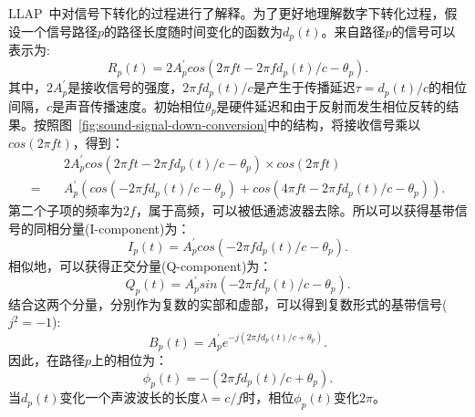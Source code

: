 LLAP~\cite{wang2016device}中对信号下转化的过程进行了解释。为了更好地理解数字下转化过程，假设一个信号路径$p$的路径长度随时间变化的函数为$d_p\left( t\right)$。来自路径$p$的信号可以表示为:
\begin{equation}
  R_{p}\left( t\right) = 2A^{'}_{p}cos \left( 2\pi ft - 2\pi fd_{p}\left( t \right) / c - \theta_{p} \right).
\end{equation}
其中，$2A^{'}_{p}$是接收信号的强度，$2\pi fd_{p}\left( t \right)/c$是产生于传播延迟$\tau=d_{p}\left(t\right)/c$的相位间隔，$c$是声音传播速度。初始相位$\theta_p$是硬件延迟和由于反射而发生相位反转的结果。按照图~\ref{fig:sound-signal-down-conversion}中的结构，将接收信号乘以$cos\left( 2\pi ft \right)$，得到：
\begin{equation}
\begin{aligned}
&2A_{p}^{'}cos \left( 2\pi ft - 2\pi fd_{p}\left( t\right)/c - \theta_{p} \right) \times cos\left( 2\pi ft\right) \\ 
= \quad &A_{p}^{'}\left( cos\left( -2\pi fd_{p}\left( t\right)/c - \theta_{p} \right) + cos\left( 4\pi ft - 2\pi fd_{p}\left( t\right)/c - \theta_{p} \right)  \right).
\end{aligned}
\end{equation}
第二个子项的频率为$2f$，属于高频，可以被低通滤波器去除。所以可以获得基带信号的同相分量(I-component)为：
\begin{equation}
 I_{p}\left( t\right) = A_{p}^{'}cos \left( -2\pi fd_{p}\left( t\right)/c - \theta_{p} \right).
\end{equation}
相似地，可以获得正交分量(Q-component)为：
\begin{equation}
Q_{p}\left( t\right)=A_{p}^{'}sin\left( -2\pi fd_{p}\left(t \right)/c - \theta_{p} \right).
\end{equation}
结合这两个分量，分别作为复数的实部和虚部，可以得到复数形式的基带信号($j^2=-1$):
\begin{equation}
B_{p}\left( t\right) = A_{p}^{'}e^{-j\left( 2\pi fd_{p}\left( t\right)/c + \theta_{p} \right)}.
\end{equation}
因此，在路径$p$上的相位为：
\begin{equation}
\phi_{p}\left( t\right) = -\left( 2\pi fd_{p}\left( t\right)/c + \theta_{p} \right).
\end{equation}
当$d_{p}\left(t\right)$变化一个声波波长的长度$\lambda = c/f$时，相位$\phi_{p}\left( t\right)$变化$2\pi$。
